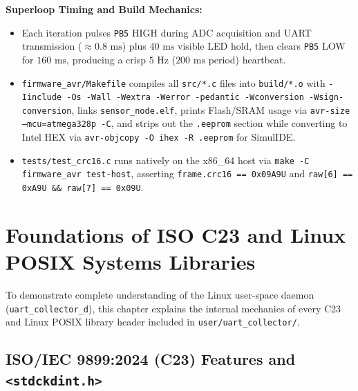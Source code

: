 \documentclass[11pt,a4paper,oneside]{report}
\begin{document}
\textbf{Superloop Timing and Build Mechanics:}
\begin{itemize}
\item Each iteration pulses \texttt{PB5} HIGH during ADC acquisition and UART transmission ($\approx 0.8\text{ ms}$) plus $40\text{ ms}$ visible LED hold, then clears \texttt{PB5} LOW for $160\text{ ms}$, producing a crisp $5\text{ Hz}$ ($200\text{ ms}$ period) heartbeat.
\item \texttt{firmware\_avr/Makefile} compiles all \texttt{src/*.c} files into \texttt{build/*.o} with \texttt{-Iinclude -Os -Wall -Wextra -Werror -pedantic -Wconversion -Wsign-conversion}, links \texttt{sensor\_node.elf}, prints Flash/SRAM usage via \texttt{avr-size --mcu=atmega328p -C}, and strips out the \texttt{.eeprom} section while converting to Intel HEX via \texttt{avr-objcopy -O ihex -R .eeprom} for SimulIDE.
\item \texttt{tests/test\_crc16.c} runs natively on the x86\_64 host via \texttt{make -C firmware\_avr test-host}, asserting \texttt{frame.crc16 == 0x09A9U} and \texttt{raw[6] == 0xA9U \&\& raw[7] == 0x09U}.
\end{itemize}


\chapter{Foundations of ISO C23 and Linux POSIX Systems Libraries}

To demonstrate complete understanding of the Linux user-space daemon (\texttt{uart\_collector\_d}), this chapter explains the internal mechanics of every C23 and Linux POSIX library header included in \texttt{user/uart\_collector/}.

\section{ISO/IEC 9899:2024 (C23) Features and \texttt{<stdckdint.h>}}
\end{document}
